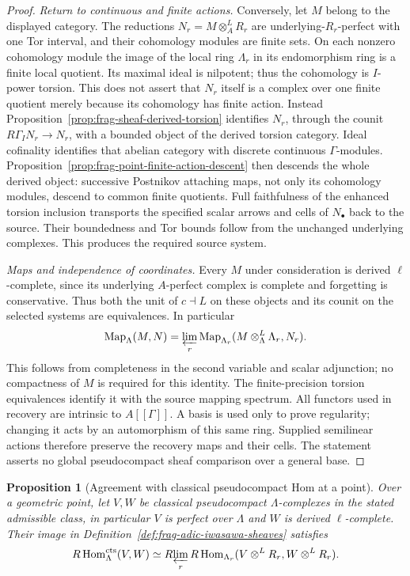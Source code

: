 \documentclass[11pt]{article}
\newtheorem{proposition}[theorem]{Proposition}
\theoremstyle{definition}
\theoremstyle{remark}
\begin{document}
\begin{proof}
\emph{Return to continuous and finite actions.}
Conversely, let $M$ belong to the displayed category.  The reductions
$N_r=M\otimes_A^LR_r$ are underlying-$R_r$-perfect with one Tor
interval, and their cohomology modules are finite sets.  On each
nonzero cohomology module the image of the local ring $\Lambda_r$
in its endomorphism ring is a finite local quotient.  Its maximal
ideal is nilpotent; thus the cohomology is $I$-power torsion.
This does not assert that $N_r$ itself is a complex over one finite
quotient merely because its cohomology has finite action.
Instead Proposition~\ref{prop:frag-sheaf-derived-torsion} identifies
$N_r$, through the counit $R\Gamma_I N_r\to N_r$, with a bounded
object of the derived torsion category.  Ideal cofinality identifies
that abelian category with discrete continuous $\Gamma$-modules.
Proposition~\ref{prop:frag-point-finite-action-descent} then descends
the whole derived object: successive Postnikov attaching maps, not
only its cohomology modules, descend to common finite quotients.
Full faithfulness of the enhanced torsion inclusion transports the
specified scalar arrows and cells of $N_\bullet$ back to the source.
Their boundedness and Tor bounds follow from the unchanged
underlying complexes.  This produces the required source system.

\emph{Maps and independence of coordinates.}
Every $M$ under consideration is derived $\ell$-complete, since
its underlying $A$-perfect complex is complete and forgetting is
conservative.  Thus both the unit of $c\dashv L$ on these objects
and its counit on the selected systems are equivalences.  In particular
\[
 \operatorname{Map}_\Lambda(M,N)
 =\varprojlim_r\operatorname{Map}_{\Lambda_r}
       (M\otimes_\Lambda^L\Lambda_r,N_r).
\]
This follows from completeness in the second variable and scalar
adjunction; no compactness of $M$ is required for this identity.
The finite-precision torsion equivalences identify it with the source
mapping spectrum.  All functors used in recovery are intrinsic to
$A[[\Gamma]]$.  A basis is used only to prove regularity; changing it
acts by an automorphism of this same ring.  Supplied semilinear actions
therefore preserve the recovery maps and their cells.  The statement
asserts no global pseudocompact sheaf comparison over a general base.
\end{proof}

\begin{proposition}[Agreement with classical pseudocompact Hom at a point]
\label{prop:frag-point-pc-Hom}
Over a geometric point, let $V,W$ be classical pseudocompact
$\Lambda$-complexes in the stated admissible class, in particular
$V$ is perfect over $\Lambda$ and $W$ is derived $\ell$-complete.
Their image in Definition~\ref{def:frag-adic-iwasawa-sheaves} satisfies
\[
R\operatorname{Hom}^{\mathrm{cts}}_\Lambda(V,W)
 \simeq R\!\varprojlim_r
 R\operatorname{Hom}_{\Lambda_r}(V\otimes^LR_r,W\otimes^LR_r).
\]
\end{proposition}
\end{document}
